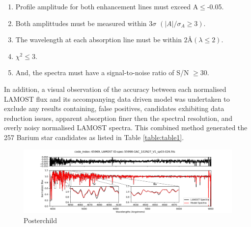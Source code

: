 \documentclass[a4paper,fleqn,usenatbib]{mnras}
\begin{document}
\begin{enumerate} 
\item Profile amplitude for both enhancement lines must exceed A$\leq$-0.05.
\item Both amplittudes must be measured within 3$\sigma$ $(|A|/\sigma _A \geq 3)$.
\item The wavelength at each absorption line must be within $2$\AA \hspace{0.2mm}$(\lambda \leq 2)$.
\item $\chi^2 \leq 3$.
\item And, the spectra must have a signal-to-noise ratio of S/N $\geq 30$.
\end{enumerate}
In addition, a visual observation of the accuracy between each normalised LAMOST flux and its accompanying data driven model was undertaken to exclude any results containing, false positives, candidates exhibiting data reduction issues, apparent absorption finer then the spectral resolution, and overly noisy normalised LAMOST spectra. This combined method generated the 257 Barium star candidates as listed in Table \ref{table:table1}. 

\begin{figure}
	\includegraphics[width=\columnwidth]{posterchild.png}
    \caption{Posterchild}
    \label{fig:figure1}
\end{figure}
\end{document}
